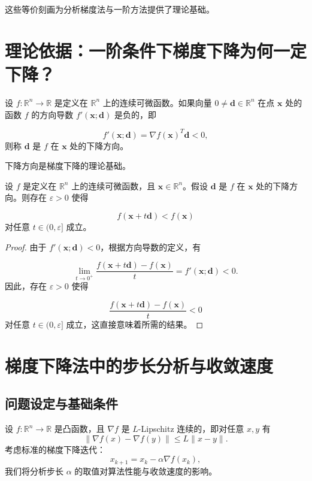 这些等价刻画为分析梯度法与一阶方法提供了理论基础。

\newpage
\section{理论依据：一阶条件下梯度下降为何一定下降？}
\begin{definition}[下降方向]
设 $f: \mathbb{R}^n \rightarrow \mathbb{R}$ 是定义在 $\mathbb{R}^n$ 上的连续可微函数。如果向量 $0 \neq \mathbf{d} \in \mathbb{R}^n$ 在点 $\mathbf{x}$ 处的函数 $f$ 的方向导数 $f'(\mathbf{x}; \mathbf{d})$ 是负的，即

$$
f'(\mathbf{x}; \mathbf{d}) = \nabla f(\mathbf{x})^T \mathbf{d} < 0,
$$ 
则称 $\mathbf{d}$ 是 $f$ 在 $\mathbf{x}$ 处的下降方向。
\begin{myalert}
下降方向是梯度下降的理论基础。
\end{myalert}
\end{definition}
\begin{shaded}
\begin{lemma}[下降方向的下降性质]
设 $f$ 是定义在 $\mathbb{R}^n$ 上的连续可微函数，且 $\mathbf{x} \in \mathbb{R}^n$。假设 $\mathbf{d}$ 是 $f$ 在 $\mathbf{x}$ 处的下降方向。则存在 $\varepsilon > 0$ 使得

$$
f(\mathbf{x} + t\mathbf{d}) < f(\mathbf{x})
$$ 
对任意 $t \in (0, \varepsilon]$ 成立。
\end{lemma}
\begin{proof}
由于 $f'(\mathbf{x}; \mathbf{d}) < 0$，根据方向导数的定义，有

$$
\lim_{t \to 0^+} \frac{f(\mathbf{x} + t\mathbf{d}) - f(\mathbf{x})}{t} = f'(\mathbf{x}; \mathbf{d}) < 0.
$$ 
因此，存在 $\varepsilon > 0$ 使得

$$
\frac{f(\mathbf{x} + t\mathbf{d}) - f(\mathbf{x})}{t} < 0
$$ 
对任意 $t \in (0, \varepsilon]$ 成立，这直接意味着所需的结果。
\end{proof}
\end{shaded}
\newpage
\section{梯度下降法中的步长分析与收敛速度}
\subsection{问题设定与基础条件}

设 $f:\mathbb{R}^n \to \mathbb{R}$ 是凸函数，且 $\nabla f$ 是 $L$-Lipschitz 连续的，即对任意 $x,y$ 有
\[
\|\nabla f(x) - \nabla f(y)\| \le L \|x - y\|.
\]
考虑标准的梯度下降迭代：
\[
x_{k+1} = x_k - \alpha \nabla f(x_k),
\]
我们将分析步长 $\alpha$ 的取值对算法性能与收敛速度的影响。


